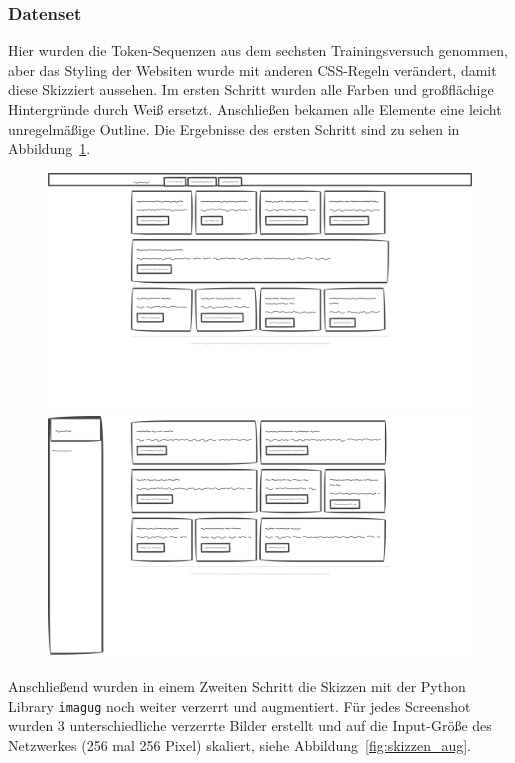 \documentclass[pdftex,a4paper,halfparskip, article]{scrartcl}
\begin{document}
\subsubsection*{Datenset}

Hier wurden die Token-Sequenzen aus dem sechsten Trainingsversuch genommen, aber das Styling der Websiten wurde mit anderen CSS-Regeln verändert, damit diese Skizziert aussehen. Im ersten Schritt wurden alle Farben und großflächige Hintergründe durch Weiß ersetzt. Anschließen bekamen alle Elemente eine leicht unregelmäßige Outline. Die Ergebnisse des ersten Schritt sind zu sehen in Abbildung~\ref{fig:skizzen}.

\begin{figure}
\centering
\begin{minipage}{.5\textwidth}
  \centering
  \includegraphics[width=0.8\linewidth]{skizze_1}
\end{minipage}%
\begin{minipage}{.5\textwidth}
  \centering
  \includegraphics[width=0.8\linewidth]{skizze_2}
\end{minipage}
  \label{fig:skizzen}
\end{figure}

Anschließend wurden in einem Zweiten Schritt die Skizzen mit der Python Library \texttt{imagug} noch weiter verzerrt und augmentiert. Für jedes Screenshot wurden 3 unterschiedliche verzerrte Bilder erstellt und auf die Input-Größe des Netzwerkes (256 mal 256 Pixel) skaliert, siehe Abbildung~\ref{fig:skizzen_aug}.
\end{document}
